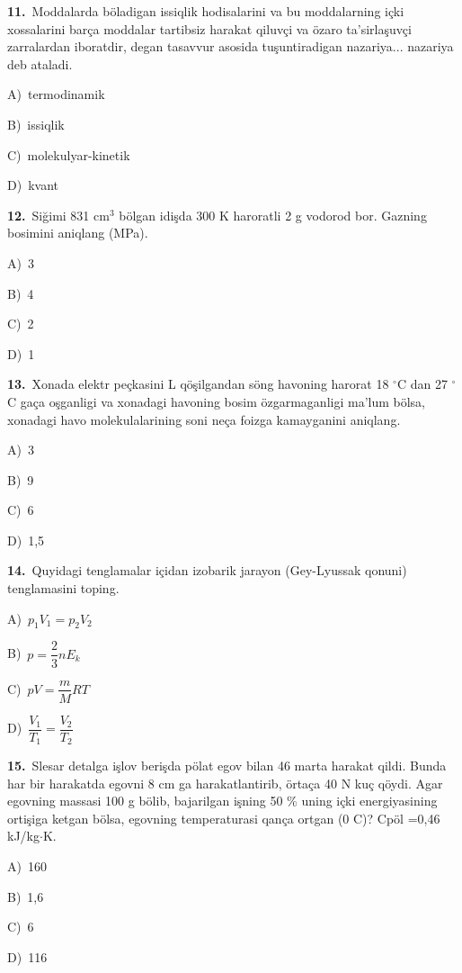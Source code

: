 \documentclass[11pt,a4paper]{article}
\newcommand{\opt}[2]{\hspace*{4mm}#1)\ #2\par}
\begin{document}
\noindent\begin{minipage}{\linewidth}
\textbf{11.}\ Moddalarda böladigan issiqlik hodisalarini va bu moddalarning içki xossalarini barça moddalar tartibsiz harakat qiluvçi va özaro ta’sirlaşuvçi zarralardan iboratdir, degan tasavvur asosida tuşuntiradigan nazariya... nazariya deb ataladi.\par\smallskip
\opt{A}{termodinamik}
\opt{B}{issiqlik}
\opt{C}{molekulyar-kinetik}
\opt{D}{kvant}
\end{minipage}\vspace{9pt}\par
\noindent\begin{minipage}{\linewidth}
\textbf{12.}\ Siğimi 831 cm$^{3}$ bölgan idişda 300 K haroratli 2 g vodorod bor. Gazning bosimini aniqlang (MPa).\par\smallskip
\opt{A}{3}
\opt{B}{4}
\opt{C}{2}
\opt{D}{1}
\end{minipage}\vspace{9pt}\par
\noindent\begin{minipage}{\linewidth}
\textbf{13.}\ Xonada elektr peçkasini L qöşilgandan söng havoning harorat 18 $^\circ$C dan 27 $^\circ$C gaça oşganligi va xonadagi havoning bosim özgarmaganligi ma’lum bölsa, xonadagi havo molekulalarining soni neça foizga kamayganini aniqlang.\par\smallskip
\opt{A}{3}
\opt{B}{9}
\opt{C}{6}
\opt{D}{1,5}
\end{minipage}\vspace{9pt}\par
\noindent\begin{minipage}{\linewidth}
\textbf{14.}\ Quyidagi tenglamalar içidan izobarik jarayon (Gey-Lyussak qonuni) tenglamasini toping.\par\smallskip
\opt{A}{$p_1V_1=p_2V_2$}
\opt{B}{$p=\dfrac23nE_k$}
\opt{C}{$pV=\dfrac{m}{M}RT$}
\opt{D}{$\dfrac{V_1}{T_1}=\dfrac{V_2}{T_2}$}
\end{minipage}\vspace{9pt}\par
\noindent\begin{minipage}{\linewidth}
\textbf{15.}\ Slesar detalga işlov berişda pölat egov bilan 46 marta harakat qildi. Bunda har bir harakatda egovni 8 cm ga harakatlantirib, örtaça 40 N kuç qöydi. Agar egovning massasi 100 g bölib, bajarilgan işning 50 \% uning içki energiyasining ortişiga ketgan bölsa, egovning temperaturasi qança ortgan (0 C)? Cpöl =0,46 kJ/kg$\cdot$K.\par\smallskip
\opt{A}{160}
\opt{B}{1,6}
\opt{C}{6}
\opt{D}{116}
\end{minipage}\vspace{9pt}\par
\end{document}
